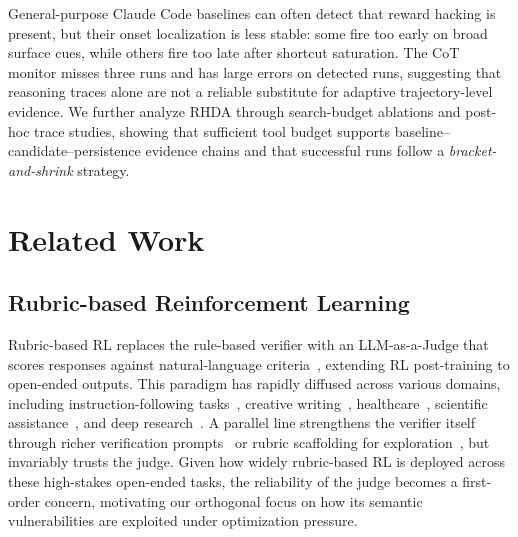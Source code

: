 \documentclass{llmxive}
\begin{document}
General-purpose Claude Code baselines can often detect that reward hacking is present, but their onset localization is less stable: some fire too early on broad surface cues, while others fire too late after shortcut saturation. The CoT monitor misses three runs and has large errors on detected runs, suggesting that reasoning traces alone are not a reliable substitute for adaptive trajectory-level evidence. We further analyze RHDA through search-budget ablations and post-hoc trace studies, showing that sufficient tool budget supports baseline--candidate--persistence evidence chains and that successful runs follow a \emph{bracket-and-shrink} strategy.


\section{Related Work}

\subsection{Rubric-based Reinforcement Learning}


Rubric-based RL replaces the rule-based verifier with an LLM-as-a-Judge that scores responses against natural-language criteria~\citep{gunjalRubricsRewardsReinforcement2025, yeSelfRewardingRubricBasedReinforcement2025, huangReinforcementLearningRubric2025, jia2026autorubricrubricbasedgenerativerewards}, extending RL post-training to open-ended outputs. This paradigm has rapidly diffused across various domains, including instruction-following tasks~\citep{heAdvancedIFRubricBasedBenchmarking2025, pengVerIFVerificationEngineering2025, guoIFDECORATORWrappingInstruction2025, xu2026rubricstokensbridgingresponselevel}, creative writing~\citep{liaoRLMRReinforcementLearning2025, jiaWritingZeroBridgeGap2025, liu2026r2writereflectionrevisionopenended}, healthcare~\citep{aroraHealthBenchEvaluatingLarge2025, wang2025infimedorbitaligningllmsopenended, yang2026healthscorescalablerubricsimproving, dent2026healthcraftreinforcementlearningsafety}, scientific assistance~\citep{goelTrainingAICoScientists2025, panigrahi2026heurekabenchbenchmarkingframeworkai, oneill2025sparkssciencehypothesisgeneration}, and deep research~\citep{shaoDRTuluReinforcement2025, lv2026learningqueryspecificrubricshuman, ma2025efficientrubricbasedgenerativeverifier}. A parallel line strengthens the verifier itself through richer verification prompts~\citep{pengVerIFVerificationEngineering2025, guoIFDECORATORWrappingInstruction2025} or rubric scaffolding for exploration~\citep{zhouRubricScaffoldedReinforcement2025}, but invariably trusts the judge. Given how widely rubric-based RL is deployed across these high-stakes open-ended tasks, the reliability of the judge becomes a first-order concern, motivating our orthogonal focus on how its semantic vulnerabilities are exploited under optimization pressure.
\end{document}

